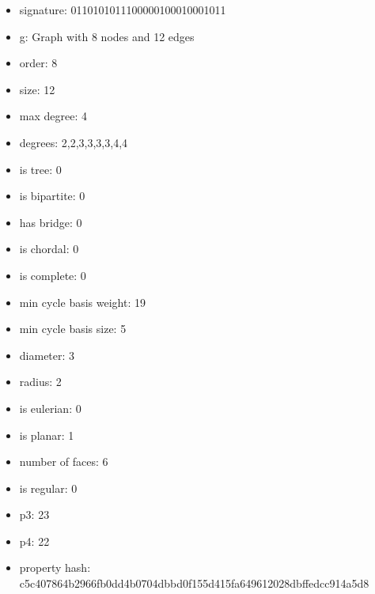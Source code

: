 \begin{itemize}
\item signature: 0110101011100000100010001011
\item g: Graph with 8 nodes and 12 edges
\item order: 8
\item size: 12
\item max degree: 4
\item degrees: 2,2,3,3,3,3,4,4
\item is tree: 0
\item is bipartite: 0
\item has bridge: 0
\item is chordal: 0
\item is complete: 0
\item min cycle basis weight: 19
\item min cycle basis size: 5
\item diameter: 3
\item radius: 2
\item is eulerian: 0
\item is planar: 1
\item number of faces: 6
\item is regular: 0
\item p3: 23
\item p4: 22
\item property hash: c5c407864b2966fb0dd4b0704dbbd0f155d415fa649612028dbffedcc914a5d8
\end{itemize}
\newpage
\begin{figure}
\end{figure}
